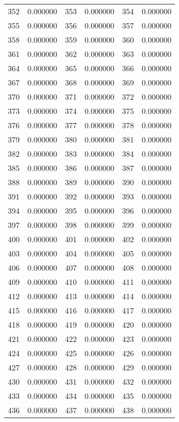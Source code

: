 \documentclass[12pt]{article}
\begin{document}
\begin{longtable}{@{}cc|cc|cc@{}}
352 & 0.000000 & 353 & 0.000000 & 354 & 0.000000 \\
355 & 0.000000 & 356 & 0.000000 & 357 & 0.000000 \\
358 & 0.000000 & 359 & 0.000000 & 360 & 0.000000 \\
361 & 0.000000 & 362 & 0.000000 & 363 & 0.000000 \\
364 & 0.000000 & 365 & 0.000000 & 366 & 0.000000 \\
367 & 0.000000 & 368 & 0.000000 & 369 & 0.000000 \\
370 & 0.000000 & 371 & 0.000000 & 372 & 0.000000 \\
373 & 0.000000 & 374 & 0.000000 & 375 & 0.000000 \\
376 & 0.000000 & 377 & 0.000000 & 378 & 0.000000 \\
379 & 0.000000 & 380 & 0.000000 & 381 & 0.000000 \\
382 & 0.000000 & 383 & 0.000000 & 384 & 0.000000 \\
385 & 0.000000 & 386 & 0.000000 & 387 & 0.000000 \\
388 & 0.000000 & 389 & 0.000000 & 390 & 0.000000 \\
391 & 0.000000 & 392 & 0.000000 & 393 & 0.000000 \\
394 & 0.000000 & 395 & 0.000000 & 396 & 0.000000 \\
397 & 0.000000 & 398 & 0.000000 & 399 & 0.000000 \\
400 & 0.000000 & 401 & 0.000000 & 402 & 0.000000 \\
403 & 0.000000 & 404 & 0.000000 & 405 & 0.000000 \\
406 & 0.000000 & 407 & 0.000000 & 408 & 0.000000 \\
409 & 0.000000 & 410 & 0.000000 & 411 & 0.000000 \\
412 & 0.000000 & 413 & 0.000000 & 414 & 0.000000 \\
415 & 0.000000 & 416 & 0.000000 & 417 & 0.000000 \\
418 & 0.000000 & 419 & 0.000000 & 420 & 0.000000 \\
421 & 0.000000 & 422 & 0.000000 & 423 & 0.000000 \\
424 & 0.000000 & 425 & 0.000000 & 426 & 0.000000 \\
427 & 0.000000 & 428 & 0.000000 & 429 & 0.000000 \\
430 & 0.000000 & 431 & 0.000000 & 432 & 0.000000 \\
433 & 0.000000 & 434 & 0.000000 & 435 & 0.000000 \\
436 & 0.000000 & 437 & 0.000000 & 438 & 0.000000 \\

\end{longtable}
\end{document}
